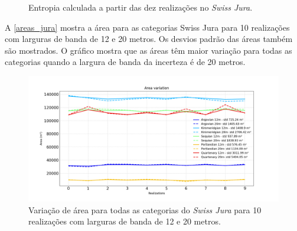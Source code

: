 \begin{figure}[H]
    \centering
    \caption{Entropia calculada a partir das dez realizações no \textit{Swiss Jura}.} \label{jura_entropy}
     \hspace{1em}
\end{figure}

A \autoref{areas_jura} mostra a área para as categorias Swiss Jura para 10 realizações com larguras de banda de 12 e 20 metros. Os desvios padrão das áreas também são mostrados. O gráfico mostra que as áreas têm maior variação para todas as categorias quando a largura de banda da incerteza é de 20 metros.

\begin{figure}[H]
	\caption{\label{areas_jura} Variação de área para todas as categorias do \textit{Swiss Jura} para 10 realizações com larguras de banda de 12 e 20 metros.}
	\centering
		\includegraphics[width=\textwidth]{capitulo_3/imagens/areasjura.png}
\end{figure}

